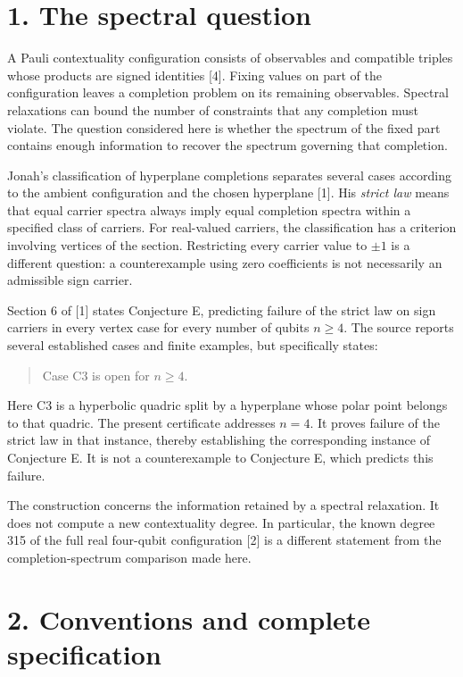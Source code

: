 \documentclass[11pt,letterpaper]{article}
\begin{document}
\section{1. The spectral question}\label{the-spectral-question}

A Pauli contextuality configuration consists of observables and compatible triples whose products are signed identities {[}4{]}. Fixing values on part of the configuration leaves a completion problem on its remaining observables. Spectral relaxations can bound the number of constraints that any completion must violate. The question considered here is whether the spectrum of the fixed part contains enough information to recover the spectrum governing that completion.

Jonah's classification of hyperplane completions separates several cases according to the ambient configuration and the chosen hyperplane {[}1{]}. His \emph{strict law} means that equal carrier spectra always imply equal completion spectra within a specified class of carriers. For real-valued carriers, the classification has a criterion involving vertices of the section. Restricting every carrier value to \(\pm1\) is a different question: a counterexample using zero coefficients is not necessarily an admissible sign carrier.

Section 6 of {[}1{]} states Conjecture E, predicting failure of the strict law on sign carriers in every vertex case for every number of qubits \(n\ge4\). The source reports several established cases and finite examples, but specifically states:

\begin{quote}
Case C3 is open for \(n\ge4\).
\end{quote}

Here C3 is a hyperbolic quadric split by a hyperplane whose polar point belongs to that quadric. The present certificate addresses \(n=4\). It proves failure of the strict law in that instance, thereby establishing the corresponding instance of Conjecture E. It is not a counterexample to Conjecture E, which predicts this failure.

The construction concerns the information retained by a spectral relaxation. It does not compute a new contextuality degree. In particular, the known degree 315 of the full real four-qubit configuration {[}2{]} is a different statement from the completion-spectrum comparison made here.

\section{2. Conventions and complete specification}\label{conventions-and-complete-specification}
\end{document}

